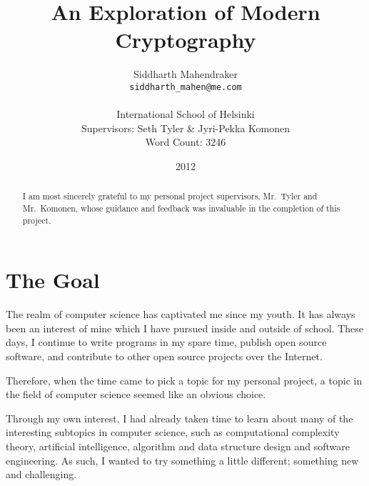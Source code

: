 \documentclass[12pt, a4paper, final]{report}
\begin{document}
\renewcommand*\thesection{\arabic{section}}
\renewcommand{\cftsecfont}{\bfseries}
\setlength\cftbeforesecskip{5pt}

\title{An Exploration of Modern Cryptography}
\author{Siddharth Mahendraker\\
    \texttt{siddharth\_mahen@me.com}\\\\
    International School of Helsinki\\
    Supervisors: Seth Tyler \& Jyri-Pekka Komonen\\
    Word Count: 3246}
\date{2012}
\maketitle

\renewcommand{\abstractname}{Acknowledgements}
\begin{abstract}
I am most sincerely grateful to my personal project
supervisors, Mr.\ Tyler and Mr.\ Komonen, whose guidance
and feedback was invaluable in the completion of this
project.
\end{abstract}

\setcounter{page}{1}
\tableofcontents
\clearpage

\section*{The Goal}
\setcounter{page}{1}


The realm of computer science has captivated me since my youth. It has
always been an interest of mine which I have pursued inside and outside
of school. These days, I continue to write programs in my spare time,
publish open source software, and contribute to other open source
projects over the Internet.

Therefore, when the time came to pick a topic for my personal project,
a topic in the field of computer science seemed like an obvious choice.

Through my own interest, I had already taken time to learn about many
of the interesting subtopics in computer science, such as computational
complexity theory, artificial intelligence, algorithm and data structure
design and software engineering. As such, I wanted to try something
a little different; something new and challenging.
\end{document}
